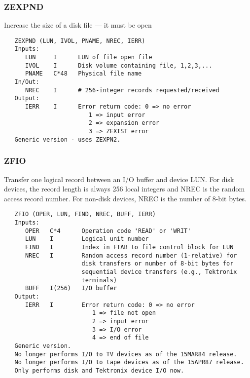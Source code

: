 \subsubsection{ZEXPND}
Increase the size of a disk file --- it must be open
\begin{verbatim}
   ZEXPND (LUN, IVOL, PNAME, NREC, IERR)
   Inputs:
      LUN     I      LUN of file open file
      IVOL    I      Disk volume containing file, 1,2,3,...
      PNAME   C*48   Physical file name
   In/Out:
      NREC    I      # 256-integer records requested/received
   Output:
      IERR    I      Error return code: 0 => no error
                        1 => input error
                        2 => expansion error
                        3 => ZEXIST error
   Generic version - uses ZEXPN2.
\end{verbatim}

\subsubsection{ZFIO}
Transfer one logical record between an I/O buffer and device LUN.
For disk devices, the record length is always 256 local
integers and NREC is the random access record number.  For non-disk
devices, NREC is the number of 8-bit bytes.
\begin{verbatim}
   ZFIO (OPER, LUN, FIND, NREC, BUFF, IERR)
   Inputs:
      OPER   C*4      Operation code 'READ' or 'WRIT'
      LUN    I        Logical unit number
      FIND   I        Index in FTAB to file control block for LUN
      NREC   I        Random access record number (1-relative) for
                      disk transfers or number of 8-bit bytes for
                      sequential device transfers (e.g., Tektronix
                      terminals)
      BUFF   I(256)   I/O buffer
   Output:
      IERR   I        Error return code: 0 => no error
                         1 => file not open
                         2 => input error
                         3 => I/O error
                         4 => end of file
   Generic version.
   No longer performs I/O to TV devices as of the 15MAR84 release.
   No longer performs I/O to tape devices as of the 15APR87 release.
   Only performs disk and Tektronix device I/O now.
\end{verbatim}

